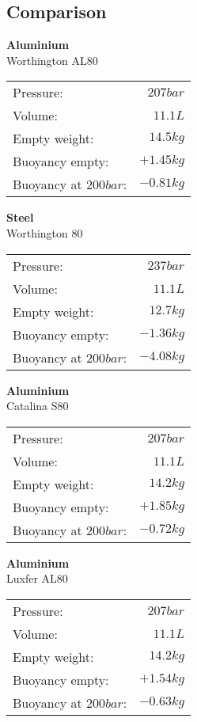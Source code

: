 \documentclass[aspectratio=1610,english,12pt]{beamer}
\begin{document}
\subsection{Comparison}
\begin{frame}{\insertsubsection}
	\footnotesize
	\begin{multicols}{2}
		\textbf{Aluminium}\\
		Worthington AL80\\
		\begin{tabularx}{\linewidth}{X r}
			Pressure:		& 	$207 bar$	\\
			Volume:			&	$11.1L$		\\
			Empty weight:	&	$14.5kg$	\\
			Buoyancy empty:	&	$+1.45kg$	\\
			Buoyancy at $200bar$:	&	$-0.81kg$
		\end{tabularx}

		\textbf{Steel}\\
		Worthington 80\\
		\begin{tabularx}{\linewidth}{X r}
			Pressure:		& 	$237 bar$	\\
			Volume:			&	$11.1L$		\\
			Empty weight:	&	$12.7kg$	\\
			Buoyancy empty:	&	$-1.36kg$	\\
			Buoyancy at $200bar$:	&	$-4.08kg$
		\end{tabularx}
	\end{multicols}

	\vspace{1em}

	\begin{multicols}{2}
		\textbf{Aluminium}\\
		Catalina S80\\
		\begin{tabularx}{\linewidth}{X r}
			Pressure:		& 	$207 bar$	\\
			Volume:			&	$11.1L$		\\
			Empty weight:	&	$14.2kg$	\\
			Buoyancy empty:	&	$+1.85kg$	\\
			Buoyancy at $200bar$:	&	$-0.72kg$
		\end{tabularx}

		\textbf{Aluminium}\\
		Luxfer AL80\\
		\begin{tabularx}{\linewidth}{X r}
			Pressure:		& 	$207 bar$	\\
			Volume:			&	$11.1L$		\\
			Empty weight:	&	$14.2kg$	\\
			Buoyancy empty:	&	$+1.54kg$	\\
			Buoyancy at $200bar$:	&	$-0.63kg$
		\end{tabularx}
	\end{multicols}
\end{frame}
\end{document}
